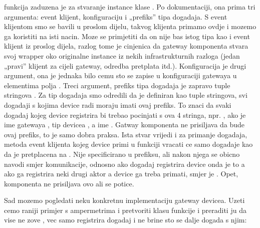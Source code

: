 \documentclass[letterpaper,10pt,croatian]{sphinxmanual}
\begin{document}
\sphinxAtStartPar
{} funkcija zaduzena je za stvaranje instance klase .
Po dokumentaciji, ona prima tri argumenta: event klijent, konfiguraciju i
„prefiks” tipa dogadaja. S event klijentom smo se bavili u proslom dijelu,
takvog klijenta primamo ovdje i mozemo ga koristiti na isti nacin. Moze se
primjetiti da on nije bas istog tipa kao i event klijent iz proslog dijela,
razlog tome je cinjenica da gateway komponenta stvara svoj wrapper oko
originalne instance iz nekih infrastrukturnih razloga (jedan „pravi” klijent za
cijeli gateway, odredba pretplata itd.). Konfiguracija je drugi argument, ona
je jednaka bilo cemu sto se zapise u konfiguraciji gatewaya u elementima polja
. Treci argument, prefiks tipa dogadaja je zapravo tuple stringova
. Za tip dogadaja smo
odredili da je definiran kao tuple stringova, svi dogadaji s kojima device radi
moraju imati ovaj prefiks. To znaci da svaki dogadaj kojeg device registrira bi
trebao pocinjati s ova 4 stringa, npr. , ako je ime gatewaya ,
tip devicea , a ime . Gatway komponenta ne
prisiljava da bude ovaj prefiks, to je samo dobra praksa. Ista stvar vrijedi i
za primanje dogadaja,  metoda event klijenta kojeg device primi u
 funkciji vracati ce samo dogadaje kao da je pretplacena na
. Nije specificirano u prefiksu, ali nakon njega
se obicno navodi smjer komunikacije, odnosno ako dogadaj registrira device onda
je to  a ako ga registrira neki drugi aktor a device ga treba
primati, smjer je . Opet, komponenta ne prisiljava ovo ali se potice.

\sphinxAtStartPar
Sad mozemo pogledati neku konkretnu implementaciju gateway devicea. Uzeti cemo
raniji primjer s ampermetrima i pretvoriti klasu funkcije  i
preraditi ju da vise ne zove , vec samo registrira dogadaj i ne
brine sto se dalje dogada s njim:
\end{document}
